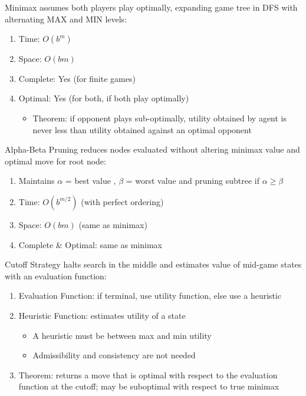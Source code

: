 \documentclass[12pt, a4paper]{article}
\begin{document}
\begin{multicols*}{3}
Minimax assumes both players play optimally, expanding game tree in DFS with alternating MAX and MIN levels:
\begin{enumerate}[\roman*.]
  \item Time: $O(b^m)$
  \item Space: $O(bm)$ 
  \item Complete: Yes (for finite games)
  \item Optimal: Yes (for both, if both play optimally)
    \begin{itemize}[leftmargin=*]\vspace{3pt}
      \item Theorem: if opponent plays sub-optimally, utility obtained by agent is never less than utility obtained against an optimal opponent
    \end{itemize}
\end{enumerate}

Alpha-Beta Pruning reduces nodes evaluated without altering minimax value and optimal move for root node:
\begin{enumerate}[\roman*.]
  \item Maintains $\alpha$ = best value , $\beta$ = worst value and pruning subtree if $\alpha \geq \beta$ 
  \item Time: $O(b^{m/2})$ (with perfect ordering)
  \item Space: $O(bm)$ (same as minimax)
  \item Complete \& Optimal: same as minimax
\end{enumerate}

Cutoff Strategy halts search in the middle and estimates value of mid-game states with an evaluation function:
\begin{enumerate}[\roman*.]
  \item Evaluation Function: if terminal, use utility function, else use a heuristic 
  \item Heuristic Function: estimates utility of a state
    \begin{itemize}[leftmargin=*]\vspace{3pt}
      \item A heuristic must be between max and min utility
      \item Admissibility and consistency are not needed
    \end{itemize}
  \item Theorem: returns a move that is optimal with respect to the evaluation function at the cutoff; may be suboptimal with respect to true minimax
\end{enumerate}
\vspace{-1em}
\colbreak

\end{multicols*}
\end{document}
